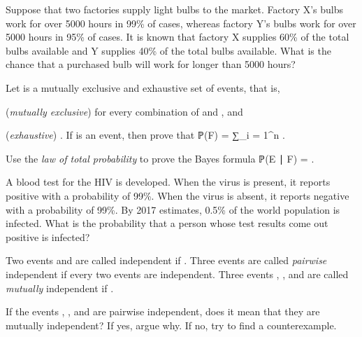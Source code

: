 	\stopsection


	\page


	\startsection [title={2019-06-26}]
		
		\startexercise [title={Bulb factory}]
			Suppose that two factories supply light bulbs to the market. Factory X's bulbs work for over 5000 hours in 99\% of cases, whereas factory Y's bulbs work for over 5000 hours in 95\% of cases. It is known that factory X supplies 60\% of the total bulbs available and Y supplies 40\% of the total bulbs available. What is the chance that a purchased bulb will work for longer than 5000 hours?
		\stopexercise

		\startexercise [title={Law of total probability}]
			Let  is a mutually exclusive and exhaustive set of events, that is,
			\startitemize [1, joinedup]
				\item  (\emph{mutually exclusive})   for every combination of  and , and
				\item  (\emph{exhaustive})  .
			\stopitemize
			If  is an event, then prove that
			\startformula
				ℙ(F)  =  ∑_{i = 1}^n  .
			\stopformula 
		\stopexercise

		\startexercise [title={Bayes formula}]
			Use the \emph{law of total probability} to prove the Bayes formula
			\startformula
				ℙ(E ∣ F) =  .
			\stopformula
		\stopexercise

		\startexercise [title={Blood test}]
			A blood test for the HIV is developed.
			When the virus is present, it reports positive with a probability of 99\%.
			When the virus is absent, it reports negative with a probability of 99\%.
			By 2017 estimates, 0.5\% of the world population is infected.
			What is the probability that a person whose test results come out positive is infected?
		\stopexercise

		\startexercise [title={Mutual and pairwise independence}]
			Two events  and  are called independent if .
			Three events are called \emph{pairwise} independent if every two events are independent.
			Three events , , and  are called \emph{mutually} independent if .

			If the events , , and  are pairwise independent, does it mean that they are mutually independent?
			If yes, argue why. If no, try to find a counterexample.
		\stopexercise

